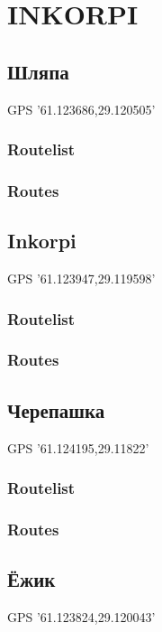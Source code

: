 \documentclass[8pt, a5paper,notitlepage,openany]{report}
\begin{document}
 \chapter{ INKORPI}
 \section{Шляпа}
 GPS '61.123686,29.120505'
\subsection{Routelist}

\newpage
\subsection{Routes}




\clearpage
 \section{Inkorpi}
 GPS '61.123947,29.119598'
\subsection{Routelist}

\newpage
\subsection{Routes}


\clearpage
 \section{Черепашка}
 GPS '61.124195,29.11822'
\subsection{Routelist}

\newpage
\subsection{Routes}


\clearpage
 \section{Ёжик}
 GPS '61.123824,29.120043'
\end{document}
